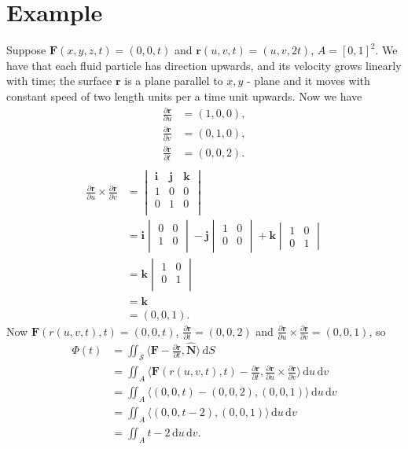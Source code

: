 \documentclass[10pt]{article}
\newcommand{\F}{\mathbf{F}}
\newcommand{\surf}{\mathbf{r}}
\newcommand{\N}{\hat{\mathbf{N}}}
\newcommand{\dr}{\partial \surf}
\newcommand{\du}{\partial u}
\newcommand{\dv}{\partial v}
\newcommand{\dt}{\partial t}
\newcommand{\dru}{\frac{\dr}{\du}}
\newcommand{\drv}{\frac{\dr}{\dv}}
\newcommand{\drt}{\frac{\dr}{\dt}}
\newcommand{\dS}{\,\mathrm{d}S}
\newcommand{\ii}{\mathbf{i}}
\newcommand{\jj}{\mathbf{j}}
\newcommand{\kk}{\mathbf{k}}
\newcommand{\ddu}{\, \mathrm{d}u}
\newcommand{\ddv}{\, \mathrm{d}v}
\begin{document}
\section*{Example}
Suppose $\F(x, y, z, t) = (0, 0, t)$ and $\surf(u, v, t) = (u, v, 2t)$, $A = \left[ 0, 1 \right]^2$. We have that each fluid particle has direction upwards, and its velocity grows linearly with time; the surface $\surf$ is a plane parallel to $x,y$ - plane and it moves with constant speed of two length units per a time unit upwards. Now we have
\begin{align*}
\dru &= (1, 0, 0), \\
\drv &= (0, 1, 0), \\
\drt &= (0, 0, 2). \\
\end{align*}
\begin{align*}
\dru \times \drv &= 
\begin{vmatrix}
\ii & \jj & \kk \\
1  & 0   & 0  \\
0  & 1   & 0 \\
\end{vmatrix} \\
      &= \ii \begin{vmatrix}
      0 & 0 \\
      1 & 0 \\
      \end{vmatrix}
      - \jj \begin{vmatrix}
      1 & 0 \\
      0 & 0 \\
      \end{vmatrix}
      + \kk \begin{vmatrix}
      1 & 0 \\
      0 & 1
      \end{vmatrix} \\
      &= \kk \begin{vmatrix}
      1 & 0 \\
      0 & 1 \\
      \end{vmatrix} \\
      &= \kk \\
      &= (0, 0, 1).
\end{align*}
Now $\F(r(u, v, t), t) = (0, 0, t)$, $\drt = (0, 0, 2)$ and $\dru \times \drv = (0, 0, 1)$, so
\begin{align*}
\Phi(t) &= \iint_{\mathscr{S}} \langle \F - \drt, \N \rangle \dS \\
          &= \iint_A \langle \F(r(u,v,t), t) - \drt, \dru \times \drv \rangle \ddu \ddv \\
          &= \iint_A \langle (0, 0, t) - (0, 0, 2), (0, 0, 1) \rangle \ddu \ddv \\
          &= \iint_A \langle (0, 0, t  - 2), (0, 0, 1) \rangle \ddu \ddv \\
          &= \iint_A t - 2 \ddu \ddv.
\end{align*}
\end{document}
